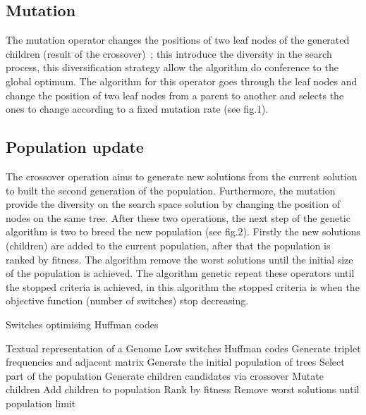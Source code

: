 \documentclass[preprint,12pt]{elsarticle}
\begin{document}
\subsection{Mutation}
The mutation operator changes the positions of two leaf nodes of the generated children (result of the crossover)~\cite{muhlenbein1992genetic}; this introduce the diversity in the search process, this diversification strategy allow the algorithm do conference to the global optimum. The algorithm for this operator goes through the leaf nodes and change the position of two leaf nodes from a parent to another and selects the ones to change according to a fixed mutation rate (see fig.1).
\subsection{Population update}
The crossover operation aims to generate new solutions from the current solution to built the second generation of the population. Furthermore, the mutation provide the diversity on the search space solution by changing the position of  nodes on the same tree. After these two operations, the next step of the genetic algorithm is two to breed the new population (see fig.2). Firstly the new solutions (children) are added to the current population, after that the population is ranked by fitness. The algorithm remove the worst solutions until the initial size of the population is achieved. The algorithm genetic repeat these operators until the stopped criteria is achieved, in this algorithm the stopped criteria is when the objective function (number of switches) stop decreasing.
\begin{algorithm}[!btph]
\caption{Switches optimising Huffman codes}
\label{alg1}
\begin{algorithmic}[1]
\REQUIRE Textual representation of a Genome
\ENSURE Low switches Huffman codes
\STATE Generate triplet frequencies and adjacent matrix 
\STATE Generate the initial  population of trees
\REPEAT 
\STATE Select part of the population
\STATE Generate children candidates via crossover
\STATE Mutate children
\STATE Add children to population
\STATE Rank by fitness
\STATE Remove worst solutions until population limit
\end{algorithmic}
\end{algorithm}
\end{document}
